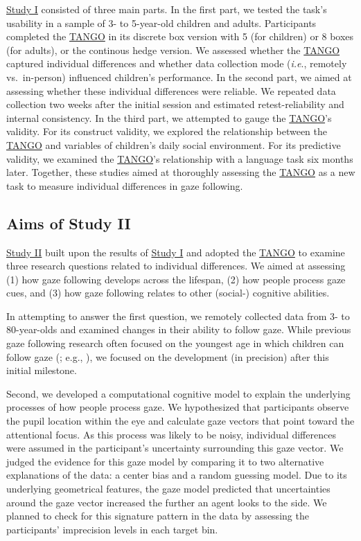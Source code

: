 \documentclass[
]{scrbook}
\begin{document}
\hyperref[studyI]{Study I} consisted of three main parts. In the first part, we tested the task's usability in a sample of 3- to 5-year-old children and adults. Participants completed the \hyperref[acronyms_TANGO]{TANGO} in its discrete box version with 5 (for children) or 8 boxes (for adults), or the continous hedge version. We assessed whether the \hyperref[acronyms_TANGO]{TANGO} captured individual differences and whether data collection mode (\emph{i.e}., remotely vs.~in-person) influenced children's performance. In the second part, we aimed at assessing whether these individual differences were reliable. We repeated data collection two weeks after the initial session and estimated retest-reliability and internal consistency. In the third part, we attempted to gauge the \hyperref[acronyms_TANGO]{TANGO}'s validity. For its construct validity, we explored the relationship between the \hyperref[acronyms_TANGO]{TANGO} and variables of children's daily social environment. For its predictive validity, we examined the \hyperref[acronyms_TANGO]{TANGO}'s relationship with a language task six months later. Together, these studies aimed at thoroughly assessing the \hyperref[acronyms_TANGO]{TANGO} as a new task to measure individual differences in gaze following.

\subsection{Aims of Study II}\label{aimsII}

\hyperref[studyII]{Study II} built upon the results of \hyperref[studyI]{Study I} and adopted the \hyperref[acronyms_TANGO]{TANGO} to examine three research questions related to individual differences. We aimed at assessing (1) how gaze following develops across the lifespan, (2) how people process gaze cues, and (3) how gaze following relates to other (social-) cognitive abilities.

In attempting to answer the first question, we remotely collected data from 3- to 80-year-olds and examined changes in their ability to follow gaze. While previous gaze following research often focused on the youngest age in which children can follow gaze (; e.g., ), we focused on the development (in precision) after this initial milestone.

Second, we developed a computational cognitive model to explain the underlying processes of how people process gaze. We hypothesized that participants observe the pupil location within the eye and calculate gaze vectors that point toward the attentional focus. As this process was likely to be noisy, individual differences were assumed in the participant's uncertainty surrounding this gaze vector. We judged the evidence for this gaze model by comparing it to two alternative explanations of the data: a center bias and a random guessing model. Due to its underlying geometrical features, the gaze model predicted that uncertainties around the gaze vector increased the further an agent looks to the side. We planned to check for this signature pattern in the data by assessing the participants' imprecision levels in each target bin.
\end{document}
